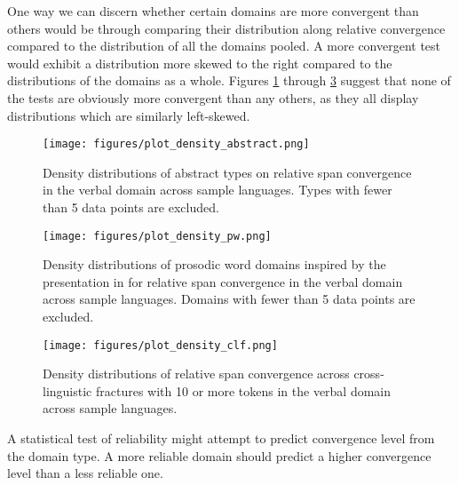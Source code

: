 \documentclass[output=paper,draftmode]{langscibook}
\begin{document}
One way we can discern whether certain domains are more convergent than others would be through comparing their distribution along relative convergence compared to the distribution of all the domains pooled. A more convergent test would exhibit a distribution more skewed to the right compared to the distributions of the domains as a whole. Figures \ref{discussion:fig:abstracttypes_density} through \ref{discussion:fig:fracturedtests_density} suggest that none of the tests are obviously more convergent than any others, as they all display distributions which are similarly left-skewed.

\begin{figure}[p]
    \texttt{[image: figures/plot\_density\_abstract.png]}
    \caption{Density distributions of abstract types on relative span convergence in the verbal domain across sample languages. Types with fewer than 5 data points are excluded.}
    \label{discussion:fig:abstracttypes_density}
\end{figure}

\begin{figure}[p]
    \texttt{[image: figures/plot\_density\_pw.png]}
    \caption{Density distributions of prosodic word domains inspired by the presentation in \citet{bickel2009distribution} for relative span convergence in the verbal domain across sample languages. Domains with fewer than 5 data points are excluded.}
    \label{discussion:fig:pwdomains_density}
\end{figure}

\begin{figure}[p]
    \texttt{[image: figures/plot\_density\_clf.png]}
    \caption{Density distributions of relative span convergence across cross-linguistic fractures with 10 or more tokens in the verbal domain across sample languages.}
    \label{discussion:fig:fracturedtests_density}
\end{figure}

\clearpage
A statistical test of reliability might attempt to predict convergence level from the domain type. A more reliable domain should predict a higher convergence level than a less reliable one.
\end{document}
